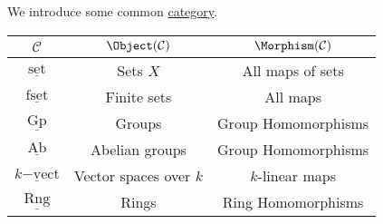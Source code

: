 \begin{eg}
	We introduce some common \hyperref[def:category]{category}.
	\begin{table}[H]
		\centering
		\begin{tabular}{c|c|c}
			\toprule
			\(\mathcal{C} \)                  & \(\Object(\mathcal{C} )\)                                                                          & \(\Morphism (\mathcal{C} )\)                                                                                                                                  \\
			\midrule
			\(\underline{\mathrm{set}}\)      & Sets \(X\)                                                                                         & All maps of sets                                                                                                                                              \\
			\(\underline{\mathrm{fset}}\)     & Finite sets                                                                                        & All maps                                                                                                                                                      \\
			\(\underline{\mathrm{Gp}}\)       & Groups                                                                                             & Group Homomorphisms                                                                                                                                           \\
			\(\underline{\mathrm{Ab}}\)       & Abelian groups                                                                                     & Group Homomorphisms                                                                                                                                           \\
			\(\underline{k\mathrm{-vect}}\)   & Vector spaces over \(k\)                                                                           & \(k\)-linear maps                                                                                                                                             \\
			\(\underline{\mathrm{Rng}}\)      & Rings                                                                                              & Ring Homomorphisms                                                                                                                                            \\

\end{tabular}
\end{table}
\end{eg}
